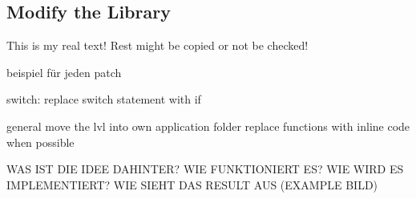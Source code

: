 \subsection{Modify the Library} \label{subsection:counter-modifications-library}
This is my real text! Rest might be copied or not be checked!



beispiel für jeden patch

switch:
replace switch statement with if


general
move the lvl into own application folder
replace functions with inline code when possible

WAS IST DIE IDEE DAHINTER? WIE FUNKTIONIERT ES? WIE WIRD ES IMPLEMENTIERT? WIE SIEHT DAS RESULT AUS (EXAMPLE BILD)\newline
